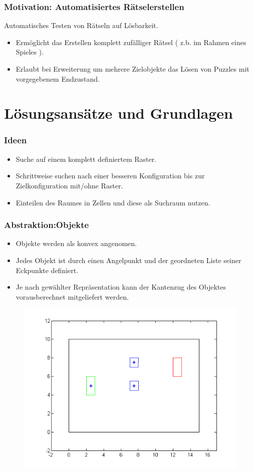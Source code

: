 \documentclass[final]{beamer}
\begin{document}
\begin{frame}
\frametitle{Motivation: Automatisiertes Rätselerstellen}
Automatisches Testen von  Rätseln auf Lösbarkeit.
\begin{itemize}
\item Ermöglicht das Erstellen komplett zufälliger Rätsel ( z.b. im Rahmen eines Spieles ).
\item Erlaubt bei Erweiterung um mehrere Zielobjekte das Lösen von Puzzles mit vorgegebenem Endzustand.
\end{itemize}
\end{frame}

\section{Lösungsansätze und Grundlagen}
\begin{frame}
\frametitle{Ideen}
\begin{itemize}
\item Suche auf einem komplett definiertem Raster.
\item Schrittweise suchen nach einer besseren Konfiguration bis zur Zielkonfiguration mit/ohne Raster.
\item Einteilen des Raumes in Zellen und diese als Suchraum nutzen.
\end{itemize}
\end{frame}

\begin{frame}
\frametitle{Abstraktion:Objekte}
\begin{itemize}
\item Objekte werden als konvex angenomen.
\item Jedes Objekt ist durch einen Angelpunkt und der geordneten Liste seiner Eckpunkte definiert.
\item Je nach gewählter Repräsentation kann der Kantenzug des Objektes vorausberechnet mitgeliefert werden.
\end{itemize}
\begin{figure}
\centering
\includegraphics[scale=0.3]{../thesis/riddle2}
\end{figure}
\end{frame}
\end{document}
